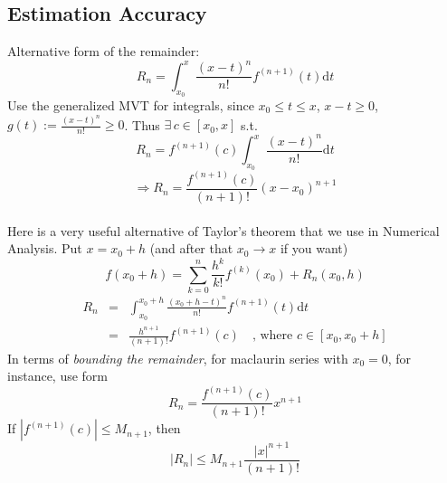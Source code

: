 \documentclass[12pt]{report}
\theoremstyle{definition}
\begin{document}
\subsection{Estimation Accuracy}
Alternative form of the remainder:\[
    R_n = \int_{x_0}^{x} \frac{{(x-t)}^{n}}{n!} f^{(n+1)}(t)\mathrm{d}t
\]Use the generalized MVT for integrals, since $x_0 \le t \le x$, $x-t \ge 0$, $g(t) := \frac{{(x-t)}^{n}}{n!} \ge 0$.
Thus $\exists \,c \in [x_0, x]$ s.t. \[
    R_n = f^{(n+1)}(c) \int_{x_0}^{x} \frac{{(x-t)}^{n}}{n!} \mathrm{d}t
\]\[
\Rightarrow R_n = \frac{f^{(n+1)}(c)}{(n+1)!} {(x-x_0)}^{n+1}
\]
\medskip
\\Here is a very useful alternative of Taylor's theorem that we use in Numerical Analysis.
Put $x = x_0 + h$ (and after that $x_0 \rightarrow x$ if you want)\[
    f(x_0 + h) = \sum_{k=0}^{n} \frac{h^{k}}{k!}f^{(k)}(x_0) + R_n(x_0,h)
\]
\begin{eqnarray*}
    R_n &=& \int_{x_0}^{x_0 + h} \frac{{(x_0 + h - t)}^{n}}{n!} f^{(n+1)}(t)\mathrm{d}t \\
        &=& \frac{h^{n+1}}{(n+1)!} f^{(n+1)}(c) \quad \text{, where $c \in [x_0, x_0 + h]$}
\end{eqnarray*}
In terms of \emph{bounding the remainder}, for maclaurin series with $x_0 = 0$, for instance, use form\[
    R_n = \frac{f^{(n+1)}(c)}{(n+1)!} x^{n+1}
\]If $\left|f^{(n+1)}(c)\right| \le M_{n+1}$, then \[
|R_n| \le M_{n+1} \frac{{|x|}^{n+1}}{(n+1)!}
\]
\end{document}
